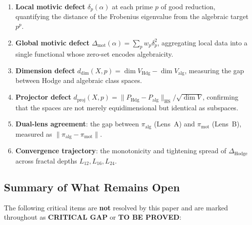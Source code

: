 \documentclass[11pt]{article}
\theoremstyle{definition}
\begin{document}
\begin{enumerate}[label=(\roman*)]
  \item \textbf{Local motivic defect} $\delta_p(\alpha)$ at each prime
    $p$ of good reduction, quantifying the distance of the Frobenius
    eigenvalue from the algebraic target $p^p$.

  \item \textbf{Global motivic defect} $\Delta_{\mathrm{mot}}(\alpha) =
    \sum_p w_p \delta_p^2$, aggregating local data into a single
    functional whose zero-set encodes algebraicity.

  \item \textbf{Dimension defect} $d_{\dim}(X, p) =
    \dim V_{\mathrm{Hdg}} - \dim V_{\mathrm{alg}}$, measuring the
    gap between Hodge and algebraic class spaces.

  \item \textbf{Projector defect} $d_{\mathrm{proj}}(X, p) =
    \|P_{\mathrm{Hdg}} - P_{\mathrm{alg}}\|_{\mathrm{HS}} /
    \sqrt{\dim V}$, confirming that the spaces are not merely
    equidimensional but identical as subspaces.

  \item \textbf{Dual-lens agreement}: the gap between
    $\pi_{\mathrm{alg}}$ (Lens~A) and $\pi_{\mathrm{mot}}$ (Lens~B),
    measured as $\|\pi_{\mathrm{alg}} - \pi_{\mathrm{mot}}\|$.

  \item \textbf{Convergence trajectory}: the monotonicity and tightening
    spread of $\Delta_{\mathrm{Hodge}}$ across fractal depths
    $L_{12}, L_{16}, L_{24}$.
\end{enumerate}

\subsection{Summary of What Remains Open}

The following critical items are \textbf{not} resolved by this paper
and are marked throughout as \textbf{CRITICAL GAP} or \textbf{TO BE PROVED}:
\end{document}
